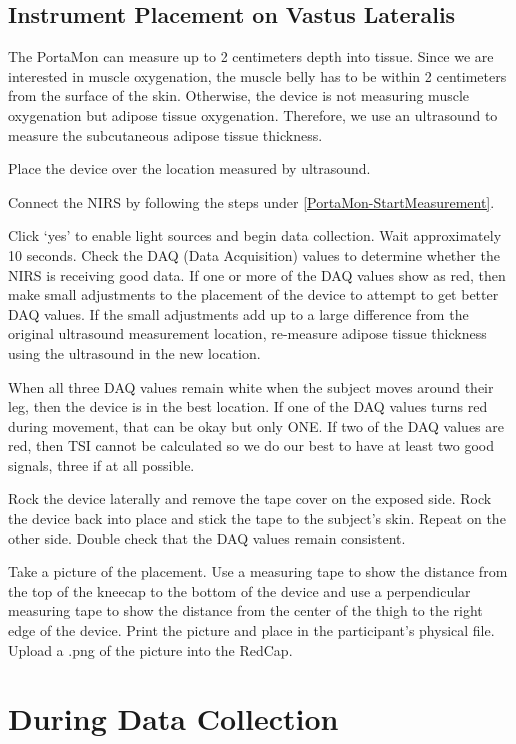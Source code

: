 \documentclass[
]{book}
\begin{document}
\hypertarget{PortaMon-Placement}{%
\subsection{Instrument Placement on Vastus Lateralis}\label{PortaMon-Placement}}

The PortaMon can measure up to 2 centimeters depth into tissue. Since we are interested in muscle oxygenation, the muscle belly has to be within 2 centimeters from the surface of the skin. Otherwise, the device is not measuring muscle oxygenation but adipose tissue oxygenation. Therefore, we use an ultrasound to measure the subcutaneous adipose tissue thickness.

Place the device over the location measured by ultrasound.

Connect the NIRS by following the steps under \ref{PortaMon-StartMeasurement}.

Click `yes' to enable light sources and begin data collection. Wait approximately 10 seconds. Check the DAQ (Data Acquisition) values to determine whether the NIRS is receiving good data. If one or more of the DAQ values show as red, then make small adjustments to the placement of the device to attempt to get better DAQ values. If the small adjustments add up to a large difference from the original ultrasound measurement location, re-measure adipose tissue thickness using the ultrasound in the new location.

When all three DAQ values remain white when the subject moves around their leg, then the device is in the best location. If one of the DAQ values turns red during movement, that can be okay but only ONE. If two of the DAQ values are red, then TSI cannot be calculated so we do our best to have at least two good signals, three if at all possible.

Rock the device laterally and remove the tape cover on the exposed side. Rock the device back into place and stick the tape to the subject's skin. Repeat on the other side. Double check that the DAQ values remain consistent.

Take a picture of the placement. Use a measuring tape to show the distance from the top of the kneecap to the bottom of the device and use a perpendicular measuring tape to show the distance from the center of the thigh to the right edge of the device. Print the picture and place in the participant's physical file. Upload a .png of the picture into the RedCap.

\hypertarget{PortaMon-DataCollection}{%
\section{During Data Collection}\label{PortaMon-DataCollection}}
\end{document}
